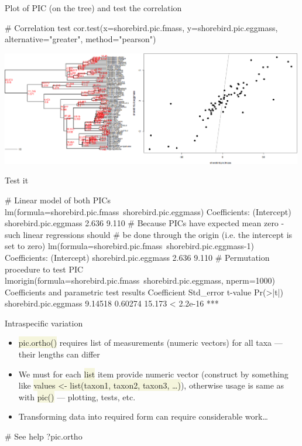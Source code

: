 \documentclass[compress, ucs, xelatex, 11pt, xcolor=svgnames, aspectratio=169,
	hyperref={
		bookmarks=true,
		unicode=true,
		colorlinks=true,
		pdftitle={Molecular data in R},
		plainpages=false,
		pdfauthor={Vojtech Zeisek},
		pdfsubject={Course about phylogeny and evolution in R},
		pdfcreator={XeLaTeX},
		pdfkeywords={R, evolution, phylogeny, molecular data},
		linkcolor=Crimson, %
		anchorcolor=Magenta, %
		citecolor=Magenta, %
		filecolor=Magenta, %
		menucolor=Magenta, %
		urlcolor=DodgerBlue, %
		pdftex},
	url={hyphens, lowtilde} %
	]{beamer}
\renewcommand{\texttt}[1]{\colorbox{Beige}{{\ttfamily #1}}}
\begin{document}
\begin{frame}[fragile]{Plot of PIC (on the tree) and test the correlation}
	\begin{spluscode}
    # Correlation test
    cor.test(x=shorebird.pic.fmass, y=shorebird.pic.eggmass,
      alternative="greater", method="pearson")
	\end{spluscode}
	\begin{center}
		\includegraphics[height=5cm]{pic.png}
	\end{center}
\end{frame}

\begin{frame}[fragile]{Test it}
	\label{pic-test}
	\begin{spluscode}
    # Linear model of both PICs
    lm(formula=shorebird.pic.fmass~shorebird.pic.eggmass)
    Coefficients:
          (Intercept)  shorebird.pic.eggmass
                2.636                  9.110
    # Because PICs have expected mean zero - such linear regressions should
    # be done through the origin (i.e. the intercept is set to zero)
    lm(formula=shorebird.pic.fmass~shorebird.pic.eggmass-1)
    Coefficients:
          (Intercept)  shorebird.pic.eggmass
                2.636                  9.110
    # Permutation procedure to test PIC
    lmorigin(formula=shorebird.pic.fmass~shorebird.pic.eggmass, nperm=1000)
    Coefficients and parametric test results 
                          Coefficient Std_error t-value  Pr(>|t|)
    shorebird.pic.eggmass     9.14518   0.60274  15.173 < 2.2e-16 ***
	\end{spluscode}
\end{frame}

\begin{frame}[fragile]{Intraspecific variation}
	\begin{itemize}
		\item \texttt{pic.ortho()} requires list of measurements (numeric vectors) for all taxa --- their lengths can differ
		\item We must for each \texttt{list} item provide numeric vector (construct by something like \texttt{values <- list(taxon1, taxon2, taxon3, \ldots)}), otherwise usage is same as with \texttt{pic()} --- plotting, tests, etc.
		\item Transforming data into required form can require considerable work\ldots
	\end{itemize}
	\begin{spluscode}
    # See help
    ?pic.ortho
	\end{spluscode}
\end{frame}
\end{document}
